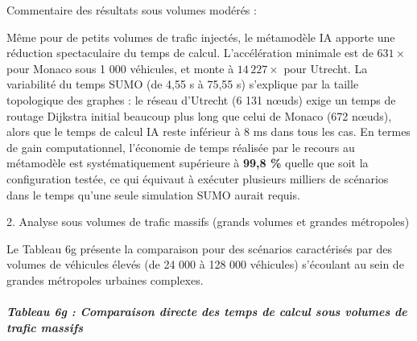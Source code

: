 \documentclass[10pt, a4paper]{article}
\begin{document}
Commentaire des résultats sous volumes modérés :

Même pour de petits volumes de trafic injectés, le métamodèle IA apporte
une réduction spectaculaire du temps de calcul. L'accélération minimale
est de \(631\times\) pour Monaco sous 1 000 véhicules, et monte à
\(14\,227\times\) pour Utrecht. La variabilité du temps SUMO (de 4,55 s
à 75,55 s) s'explique par la taille topologique des graphes : le réseau
d'Utrecht (6 131 nœuds) exige un temps de routage Dijkstra initial
beaucoup plus long que celui de Monaco (672 nœuds), alors que le temps
de calcul IA reste inférieur à 8 ms dans tous les cas. En termes de gain
computationnel, l'économie de temps réalisée par le recours au
métamodèle est systématiquement supérieure à \textbf{99,8 \%} quelle que
soit la configuration testée, ce qui équivaut à exécuter plusieurs
milliers de scénarios dans le temps qu'une seule simulation SUMO aurait
requis.

2. Analyse sous volumes de trafic massifs (grands volumes et grandes
métropoles)

Le Tableau 6g présente la comparaison pour des scénarios caractérisés
par des volumes de véhicules élevés (de 24 000 à 128 000 véhicules)
s'écoulant au sein de grandes métropoles urbaines complexes.

\subparagraph{Tableau 6g : Comparaison directe des temps de calcul sous
volumes de trafic
massifs}\label{tableau-6g-comparaison-directe-des-temps-de-calcul-sous-volumes-de-trafic-massifs}
\end{document}
